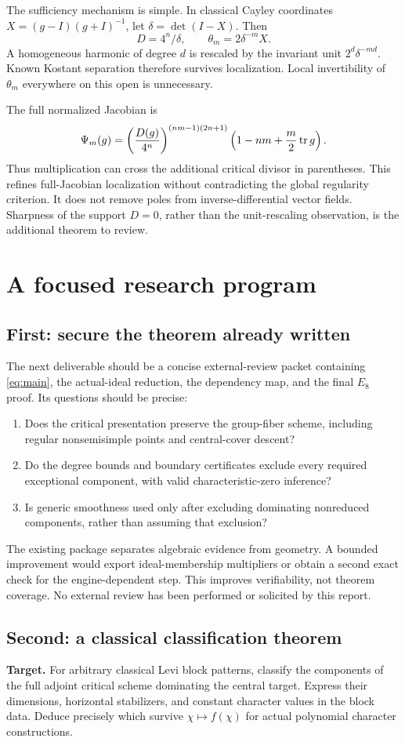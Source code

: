 The sufficiency mechanism is simple. In classical Cayley coordinates $X=(g-I)(g+I)^{-1}$, let $\delta=\det(I-X)$. Then
\[
D=4^n/\delta,\qquad\theta_m=2\delta^{-m}X.
\]
A homogeneous harmonic of degree $d$ is rescaled by the invariant unit $2^d\delta^{-md}$. Known Kostant separation therefore survives localization. Local invertibility of $\theta_m$ everywhere on this open is unnecessary.

The full normalized Jacobian is
\[
\Psi_m(g)=\left(\frac{D(g)}{4^n}\right)^{(nm-1)(2n+1)}
\left(1-nm+\frac m2\operatorname{tr} g\right).
\]
Thus multiplication can cross the additional critical divisor in parentheses. This refines full-Jacobian localization without contradicting the global regularity criterion. It does not remove poles from inverse-differential vector fields. Sharpness of the support $D=0$, rather than the unit-rescaling observation, is the additional theorem to review.

\section{A focused research program}
\subsection{First: secure the theorem already written}
The next deliverable should be a concise external-review packet containing \eqref{eq:main}, the actual-ideal reduction, the dependency map, and the final $E_8$ proof. Its questions should be precise:
\begin{enumerate}
\item Does the critical presentation preserve the group-fiber scheme, including regular nonsemisimple points and central-cover descent?
\item Do the degree bounds and boundary certificates exclude every required exceptional component, with valid characteristic-zero inference?
\item Is generic smoothness used only after excluding dominating nonreduced components, rather than assuming that exclusion?
\end{enumerate}
The existing package separates algebraic evidence from geometry. A bounded improvement would export ideal-membership multipliers or obtain a second exact check for the engine-dependent step. This improves verifiability, not theorem coverage. No external review has been performed or solicited by this report.

\subsection{Second: a classical classification theorem}
\textbf{Target.} For arbitrary classical Levi block patterns, classify the components of the full adjoint critical scheme dominating the central target. Express their dimensions, horizontal stabilizers, and constant character values in the block data. Deduce precisely which survive $\chi\mapsto f(\chi)$ for actual polynomial character constructions.

